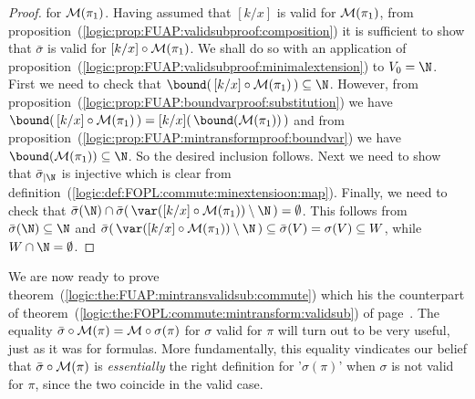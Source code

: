 \begin{proof}
for ${\cal M}(\pi_{1})$. Having assumed that $[k/x]$ is valid for
${\cal M}(\pi_{1})$, from
proposition~(\ref{logic:prop:FUAP:validsubproof:composition}) it is
sufficient to show that $\bar{\sigma}$ is valid for $[k/x]\circ{\cal
M}(\pi_{1})$. We shall do so with an application of
proposition~(\ref{logic:prop:FUAP:validsubproof:minimalextension})
to $V_{0}=\N$. First we need to check that $\bound(\,[k/x]\circ{\cal
M}(\pi_{1})\,)\subseteq\N$. However, from
proposition~(\ref{logic:prop:FUAP:boundvarproof:substitution}) we
have $\bound(\,[k/x]\circ{\cal M}(\pi_{1})\,) = [k/x](\,\bound({\cal
M}(\pi_{1}))\,)$ and from
proposition~(\ref{logic:prop:FUAP:mintransformproof:boundvar}) we
have $\bound({\cal M}(\pi_{1}))\subseteq\N$. So the desired
inclusion follows. Next we need to show that $\bar{\sigma}_{|\N}$ is
injective which is clear from
definition~(\ref{logic:def:FOPL:commute:minextensioon:map}).
Finally, we need to check that
$\bar{\sigma}(\N)\cap\bar{\sigma}(\,\var([k/x]\circ{\cal
M}(\pi_{1}))\setminus\N\,)=\emptyset$. This follows from
$\bar{\sigma}(\N)\subseteq\N$ and
$\bar{\sigma}(\,\var([k/x]\circ{\cal
M}(\pi_{1}))\setminus\N\,)\subseteq\bar{\sigma}(V)=\sigma(V)\subseteq
W$, while $W\cap\N = \emptyset$.
\end{proof}

We are now ready to prove
theorem~(\ref{logic:the:FUAP:mintransvalidsub:commute}) which his
the counterpart of
theorem~(\ref{logic:the:FOPL:commute:mintransform:validsub}) of
page~\pageref{logic:the:FOPL:commute:mintransform:validsub}. The
equality $\bar{\sigma}\circ{\cal M}(\pi)={\cal M}\circ\sigma(\pi)$
for $\sigma$ valid for $\pi$ will turn out to be very useful, just
as it was for formulas. More fundamentally, this equality vindicates
our belief that $\bar{\sigma}\circ{\cal M}(\pi)$ is {\em
essentially} the right definition for '$\sigma(\pi)$' when $\sigma$
is not valid for $\pi$, since the two coincide in the valid case.

